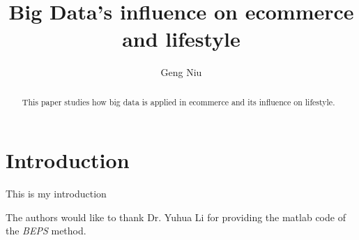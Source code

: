 \documentclass[sigconf]{acmart}
\begin{document}
\title{Big Data's influence on ecommerce and lifestyle}


\author{Geng Niu}



\begin{abstract}
This paper studies how big data is applied in ecommerce and its influence on lifestyle.
\end{abstract}



\maketitle

\section{Introduction}
This is my introduction


\begin{acks}

  The authors would like to thank Dr. Yuhua Li for providing the
  matlab code of the \textit{BEPS} method.

 
\end{acks}


 
\end{document}
